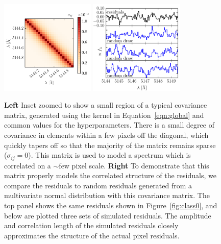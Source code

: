\documentclass[preprint]{aastex} %
\begin{document}
\begin{figure}[!htb]
\begin{center}
\includegraphics[width=0.4\textwidth]{figs/matern_matrix.pdf}
\includegraphics[width=0.4\textwidth]{figs/matern_draw.pdf}
\caption{\textbf{Left} Inset zoomed to show a small region of a typical covariance matrix, generated using the kernel in Equation~\ref{eqn:global} and common values for the hyperparameters. There is a small degree of covariance in elements within a few pixels off the diagonal, which quickly tapers off so that the majority of the matrix remains sparse ($\sigma_{ij} = 0$). This matrix is used to model a spectrum which is correlated on a $\sim$few pixel scale.
\textbf{Right} To demonstrate that this matrix properly models the correlated structure of the residuals, we compare the residuals to random residuals generated from a multivariate normal distribution with this covariance matrix. The top panel shows the same residuals shown in Figure~\ref{fig:class0}, and below are plotted three sets of simulated residuals. The amplitude and correlation length of the simulated residuals closely approximates the structure of the actual pixel residuals.}
\label{fig:matern}
\end{center}
\end{figure}
\end{document}
